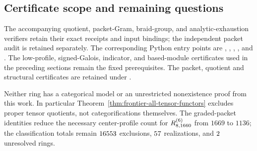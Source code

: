 

\subsection{Certificate scope and remaining questions}
The accompanying quotient, packet-Gram, braid-group, and analytic-exhaustion verifiers retain their exact receipts and input bindings; the independent packet audit is retained separately. The corresponding Python entry points are , , , , and . The low-profile, signed-Galois, indicator, and based-module certificates used in the preceding sections remain the fixed prerequisites. The packet, quotient and structural certificates are retained under .

Neither ring has a categorical model or an unrestricted nonexistence proof from this work. In particular Theorem~\ref{thm:frontier-all-tensor-functors} excludes proper tensor quotients, not categorifications themselves. The graded-packet identities reduce the necessary center-profile count for $R^{(6)}_{8,1660}$ from $1669$ to $1136$; the classification totals remain $16553$ exclusions, $57$ realizations, and $2$ unresolved rings.

